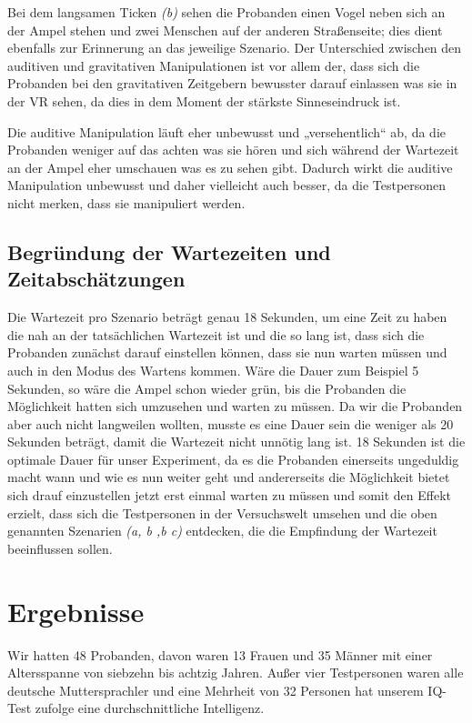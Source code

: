 \documentclass{Paper}
\begin{document}
		Bei dem langsamen Ticken \textit{(b)} sehen die Probanden einen Vogel neben sich an der Ampel stehen und zwei Menschen auf der anderen Straßenseite; dies dient ebenfalls zur Erinnerung an das jeweilige Szenario.  
		Der Unterschied zwischen den auditiven und gravitativen Manipulationen ist vor allem der, dass sich die Probanden bei den gravitativen Zeitgebern bewusster darauf einlassen was sie in der VR sehen, da dies in dem Moment der stärkste Sinneseindruck ist.
		\par
		Die auditive Manipulation läuft eher unbewusst und „versehentlich“ ab, da die Probanden weniger auf das achten was sie hören und sich während der Wartezeit an der Ampel  eher umschauen was es zu sehen gibt. Dadurch wirkt die auditive Manipulation unbewusst und daher vielleicht auch besser, da die Testpersonen nicht merken, dass sie manipuliert werden.

	\subsection{Begründung der Wartezeiten und Zeitabschätzungen}
		Die Wartezeit pro Szenario beträgt genau 18 Sekunden, um eine Zeit zu haben die nah an der tatsächlichen Wartezeit ist und die so lang ist, dass sich die Probanden zunächst darauf einstellen können, dass sie nun warten müssen und auch in den Modus des Wartens kommen. 
		Wäre die Dauer zum Beispiel 5 Sekunden, so wäre die Ampel schon wieder grün, bis die Probanden die Möglichkeit hatten sich umzusehen und  warten zu müssen.
		Da wir die Probanden aber auch nicht langweilen wollten, musste es eine Dauer sein die weniger als 20 Sekunden beträgt, damit die Wartezeit nicht unnötig lang ist. 
		18 Sekunden ist die optimale Dauer für unser Experiment, da es die Probanden einerseits ungeduldig macht wann und wie es nun weiter geht und andererseits die Möglichkeit bietet sich drauf einzustellen jetzt erst einmal warten zu müssen und somit den Effekt erzielt, dass sich die Testpersonen in der Versuchswelt umsehen und die oben genannten Szenarien \textit{(a, b ,b c)} entdecken, die die Empfindung der Wartezeit beeinflussen sollen.

\section{Ergebnisse}
Wir hatten 48 Probanden, davon waren 13 Frauen und 35 Männer mit einer Altersspanne von siebzehn bis achtzig Jahren. Außer vier Testpersonen waren alle deutsche Muttersprachler und eine Mehrheit von 32 Personen hat unserem IQ-Test zufolge eine durchschnittliche Intelligenz.
\end{document}
